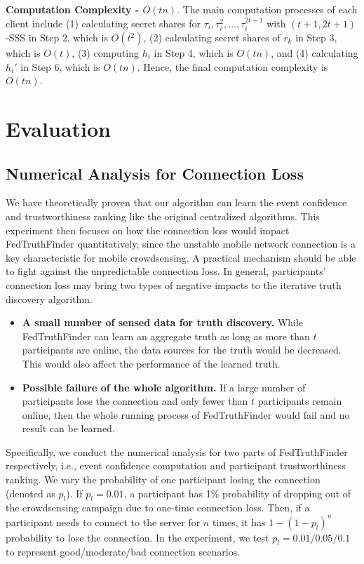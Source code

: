 \documentclass[11pt]{article}
\begin{document}
\textbf{Computation Complexity - $O(tn)$}. The main computation processes of each client include (1) calculating secret shares for $\tau_i,\tau_i^2,...,\tau_i^{2t+1}$ with $(t+1, 2t+1)$-SSS in Step 2, which is $O(t^2)$, (2) calculating secret shares of $r_k$ in Step 3, which is $O(t)$, (3) computing  $h_i$ in Step 4, which is $O(tn)$, and (4) calculating $h_i'$ in Step 6, which is $O(tn)$. Hence, the final computation complexity is $O(tn)$.





\section{Evaluation}

\subsection{Numerical Analysis for Connection Loss}
\label{sec:numeric_analysis}

We have theoretically proven that our algorithm can learn the event confidence and trustworthiness ranking like the original centralized algorithms. This experiment then focuses on how the connection loss would impact FedTruthFinder quantitatively, since the unstable mobile network connection is a key characteristic for mobile crowdsensing. A practical mechanism should be able to fight against the unpredictable connection loss.
In general, participants' connection loss may bring two types of negative impacts to the iterative truth discovery algorithm.


\begin{itemize}
	\item \textbf{A small number of sensed data for truth discovery.} While FedTruthFinder can learn an aggregate truth as long as more than $t$ participants are online, the data sources for the truth would be decreased. This would also affect the performance of the learned truth.
	\item \textbf{Possible failure of the whole algorithm.} If a large number of participants lose the connection and only fewer than $t$ participants remain online, then the whole running process of FedTruthFinder would fail and no result can be learned.
\end{itemize}

Specifically, we conduct the numerical analysis for two parts of FedTruthFinder respectively, i.e., event confidence computation and participant trustworthiness ranking. We vary the probability of one participant losing the connection (denoted as $p_l$). If $p_l=0.01$, a participant has 1\% probability of dropping out of the crowdsensing campaign due to one-time connection loss. Then, if a participant needs to connect to the server for $n$ times, it has $1-(1-p_l)^n$ probability to lose the connection. In the experiment, we test $p_l=0.01/0.05/0.1$ to represent good/moderate/bad connection scenarios.
\end{document}
